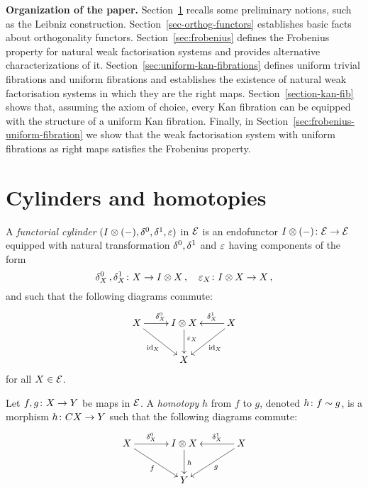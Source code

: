 \documentclass[reqno,10pt,a4paper,oneside]{amsart}
\begin{document}
\smallskip

\noindent
\textbf{Organization of the paper.} Section~\ref{sec:preliminaries} recalls some preliminary notions,
such as the Leibniz construction.
Section~\ref{sec-orthog-functors} establishes basic facts about orthogonality functors.
Section~\ref{sec:frobenius} defines the Frobenius property for natural weak factorisation
systems and provides alternative characterizations of it. 
Section~\ref{sec:uniform-kan-fibrations} defines uniform trivial fibrations and uniform fibrations and
establishes the existence of natural weak factorisation systems in which they are the 
right maps.
Section~\ref{section-kan-fib} shows that, assuming the axiom of choice, every Kan fibration
can be equipped with the structure of a uniform Kan fibration.
Finally, in Section~\ref{sec:frobenius-uniform-fibration} we show that the weak factorisation system with
uniform fibrations as right maps satisfies the Frobenius property.


  

 

\section{Cylinders and homotopies}
\label{sec:preliminaries}



\begin{definition} \label{def:cylinder}
 A \emph{functorial cylinder} $(I \otimes (-), \delta^0, \delta^1, \varepsilon)$ in $\mathcal{E}$ 
is an endofunctor $I \otimes (-) \colon \mathcal{E} \to \mathcal{E}$ equipped with natural transformation $\delta^0, \delta^1$ and $\varepsilon$ having components
of the form
\[
\delta^0_X \, , \delta^1_X \colon X \to I \otimes X \, , \quad \varepsilon_X \colon I \otimes X \to X \, ,
 \]
and such that the following diagrams commute:
\[
\xymatrix{
X  \ar[r]^{\lcyl_X} \ar[dr]_{\id_X} & \interval \otimes X \ar[d]^-(.4){\varepsilon_X} & X \ar[dl]^{\id_X} \ar[l]_-{\rcyl_X}  \\
 & X & }
 \]
 for all $X \in \mathcal{E}$.
\end{definition}

\medskip



\begin{definition}
\label{def:homotopy}
Let $f, g \colon X \to Y$ be maps in $\mathcal{E}$. A \emph{homotopy} $h$ from $f$ to $g$, denoted $h \colon f \sim g$, is a morphism $h \colon C X \to Y$ such that the following diagrams commute:
\[
\xymatrix@C=1.2cm{
X \ar[r]^-{\lcyl_X} \ar[dr]_{f} & \interval \otimes X \ar[d]^{h} & X \ar[dl]^{g} \ar[l]_-{\rcyl_X}  \\
 & Y & }
 \]
\end{definition}
\end{document}
